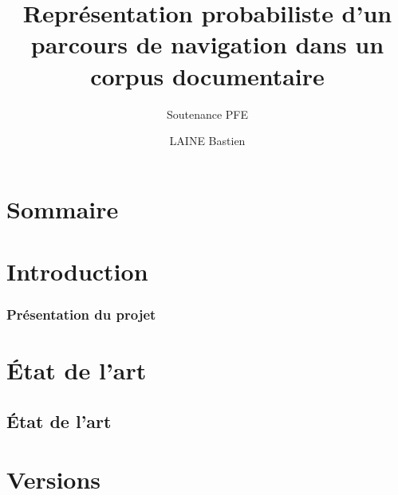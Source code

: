 \documentclass{beamer}
\title{Représentation probabiliste d’un parcours de navigation dans un corpus documentaire}
\subtitle{Soutenance PFE}
\author{LAINE Bastien}
\institute{Génie Mathématique | INSA Rouen}
\begin{document}
    \beamertemplatenavigationsymbolsempty
    \begin{frame}
        \titlepage{}
    \end{frame}

    \section*{Sommaire}
        \begin{frame}
            \tableofcontents
        \end{frame}

    \section{Introduction}
        \begin{frame}
            \frametitle{Présentation du projet}
        \end{frame}

    \section{État de l'art}
        \subsection{État de l'art}
            \begin{frame}
            \end{frame}

    \section{Versions}
\end{document}
